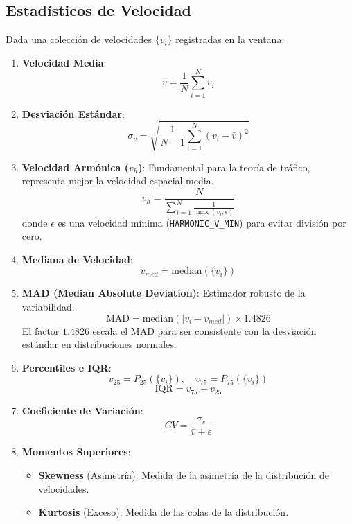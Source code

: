 \documentclass{article}
\begin{document}
\subsection{Estadísticos de Velocidad}
Dada una colección de velocidades $\{v_i\}$ registradas en la ventana:

\begin{enumerate}
    \item \textbf{Velocidad Media}:
    \[ \bar{v} = \frac{1}{N} \sum_{i=1}^N v_i \]

    \item \textbf{Desviación Estándar}:
    \[ \sigma_v = \sqrt{\frac{1}{N-1} \sum_{i=1}^N (v_i - \bar{v})^2} \]

    \item \textbf{Velocidad Armónica ($v_h$)}:
    Fundamental para la teoría de tráfico, representa mejor la velocidad espacial media.
    \[ v_h = \frac{N}{\sum_{i=1}^N \frac{1}{\max(v_i, \epsilon)}} \]
    donde $\epsilon$ es una velocidad mínima (\texttt{HARMONIC\_V\_MIN}) para evitar división por cero.

    \item \textbf{Mediana de Velocidad}:
    \[ v_{med} = \text{median}(\{v_i\}) \]

    \item \textbf{MAD (Median Absolute Deviation)}:
    Estimador robusto de la variabilidad.
    \[ \text{MAD} = \text{median}(|v_i - v_{med}|) \times 1.4826 \]
    El factor $1.4826$ escala el MAD para ser consistente con la desviación estándar en distribuciones normales.

    \item \textbf{Percentiles e IQR}:
    \[ v_{25} = P_{25}(\{v_i\}), \quad v_{75} = P_{75}(\{v_i\}) \]
    \[ \text{IQR} = v_{75} - v_{25} \]

    \item \textbf{Coeficiente de Variación}:
    \[ CV = \frac{\sigma_v}{\bar{v} + \epsilon} \]

    \item \textbf{Momentos Superiores}:
    \begin{itemize}
        \item \textbf{Skewness} (Asimetría): Medida de la asimetría de la distribución de velocidades.
        \item \textbf{Kurtosis} (Exceso): Medida de las colas de la distribución.
    \end{itemize}
\end{enumerate}
\end{document}
